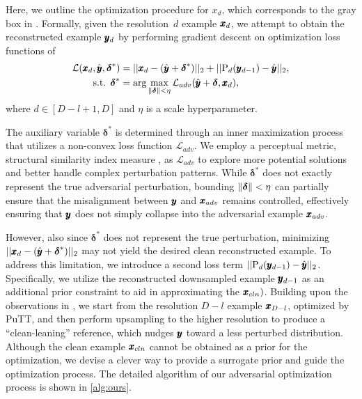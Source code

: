 Here, we outline the optimization procedure for $x_d$, which corresponds to the gray box in .
Formally, given the resolution~$d$ example $\pmb{x}_d$, we attempt to obtain the reconstructed example $\pmb{y}_d$ by performing gradient descent on optimization loss functions of
\begin{equation}
\label{eq:ours}
\begin{aligned}
    \mathcal{L}(\pmb{x}_d, \hat{\pmb{y}}, \boldsymbol{\delta}^*) &= ||\pmb{x}_d - (\hat{\pmb{y}}+\boldsymbol{\delta}^*)||_2 
    + ||\text{P}_{d} (\pmb{y}_{d-1}) - \hat{\pmb{y}}||_2, \\
    \text{s.t.  } \boldsymbol{\delta}^* &= \arg\max_{\lVert\boldsymbol{\delta}\rVert < \eta} \mathcal{L}_{adv}(\hat{\pmb{y}} + \boldsymbol{\delta}, \pmb{x}_d),
\end{aligned}
\end{equation}
where $d \in [D-l+1, D]$ and $\eta$ is a scale hyperparameter.

The auxiliary variable $\boldsymbol{\delta}^*$ is determined through an inner maximization process that utilizes a non-convex loss function $\mathcal{L}_{adv}$.
We employ a perceptual metric, structural similarity index measure \citep[SSIM,][]{hore2010image}, as $\mathcal{L}_{adv}$ to explore more potential solutions and better handle complex perturbation patterns.
While $\boldsymbol{\delta}^*$ does not exactly represent the true adversarial perturbation, bounding $\lVert\boldsymbol{\delta}\rVert<\eta$ can partially ensure that the misalignment between $\pmb{y}$ and $\pmb{x}_{adv}$ remains controlled, effectively ensuring that $\pmb{y}$ does not simply collapse into the adversarial example $\pmb{x}_{adv}$.

However, also since $\boldsymbol{\delta}^*$ does not represent the true perturbation, minimizing $||\pmb{x}_d - (\hat{\pmb{y}}+\boldsymbol{\delta}^*)||_2$ may not yield the desired clean reconstructed example. To address this limitation, we introduce a second loss term $||\text{P}_{d} (\pmb{y}_{d-1}) - \hat{\pmb{y}}||_2$.
Specifically, we utilize the reconstructed downsampled example $\pmb{y}_{d-1}$ as an additional prior constraint to aid in approximating the $\pmb{x}_{cln})$.
Building upon the observations in , we start from the resolution $D-l$ example $\pmb{x}_{D-l}$, optimized by PuTT, and then perform upsampling to the higher resolution to produce a ``clean-leaning'' reference, which nudges $\pmb{y}$ toward a less perturbed distribution.
Although the clean example $\pmb{x}_{cln}$ cannot be obtained as a prior for the optimization, we devise a clever way to provide a surrogate prior and guide the optimization process.
The detailed algorithm of our adversarial optimization process is shown in \cref{alg:ours}.

